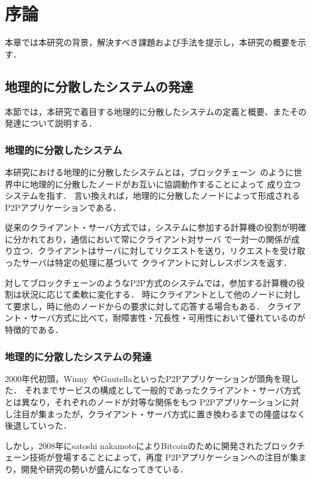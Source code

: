 \chapter{序論}
\label{introduction}

本章では本研究の背景，解決すべき課題および手法を提示し，本研究の概要を示す．

\section{地理的に分散したシステムの発達}
\label{introduction:system-growth}

本節では，本研究で着目する地理的に分散したシステムの定義と概要、またその発達について説明する．

\subsection{地理的に分散したシステム}

本研究における地理的に分散したシステムとは，ブロックチェーン~\cite{Bitcoin}のように世界中に地理的に分散したノードがお互いに協調動作することによって
成り立つシステムを指す．
言い換えれば，地理的に分散したノードによって形成されるP2Pアプリケーションである．

従来のクライアント・サーバ方式では，システムに参加する計算機の役割が明確に分かれており，通信において常にクライアント対サーバ
で一対一の関係が成り立つ．クライアントはサーバに対してリクエストを送り，リクエストを受け取ったサーバは特定の処理に基づいて
クライアントに対しレスポンスを返す．

対してブロックチェーンのようなP2P方式のシステムでは，参加する計算機の役割は状況に応じて柔軟に変化する．
時にクライアントとして他のノードに対して要求し，時に他のノードからの要求に対して応答する場合もある．
クライアント・サーバ方式に比べて，耐障害性・冗長性・可用性において優れているのが特徴的である．

\subsection{地理的に分散したシステムの発達}

2000年代初頭，Winny~\cite{Winny}やGnutellaといったP2Pアプリケーションが頭角を現した．
それまでサービスの構成として一般的であったクライアント・サーバ方式とは異なり，それぞれのノードが対等な関係をもつ
P2Pアプリケーションに対し注目が集まったが，クライアント・サーバ方式に置き換わるまでの隆盛はなく後退していった．

しかし，2008年にsatoshi nakamotoによりBitcoinのために開発されたブロックチェーン技術が登場することによって，再度
P2Pアプリケーションへの注目が集まり，開発や研究の勢いが盛んになってきている．

